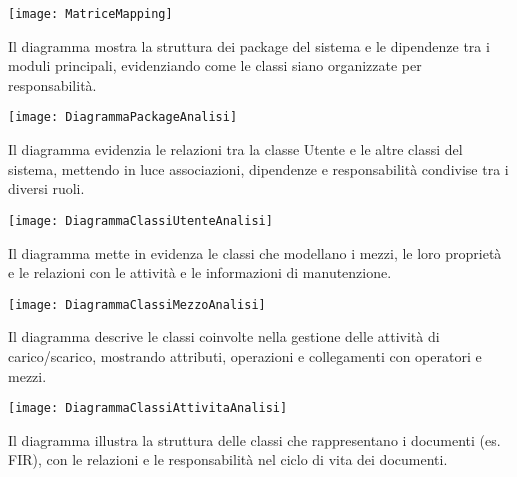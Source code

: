 \documentclass[a4paper]{report}
\begin{document}
\clearpage
{}

\begin{figure*}[!ht]
    \centering
    \texttt{[image: MatriceMapping]}
\end{figure*}



Il diagramma mostra la struttura dei package del sistema e le dipendenze tra i moduli principali, evidenziando come le classi siano organizzate per responsabilità.

\begin{figure*}[!ht]
    \centering
    \texttt{[image: DiagrammaPackageAnalisi]}
\end{figure*}

\clearpage
{}
Il diagramma evidenzia le relazioni tra la classe Utente e le altre classi del sistema, mettendo in luce associazioni, dipendenze e responsabilità condivise tra i diversi ruoli.

\begin{figure*}[!ht]
    \centering
    \texttt{[image: DiagrammaClassiUtenteAnalisi]}
\end{figure*}

\clearpage
{}
Il diagramma mette in evidenza le classi che modellano i mezzi, le loro proprietà e le relazioni con le attività e le informazioni di manutenzione.

\begin{figure*}[!ht]
    \centering
    \texttt{[image: DiagrammaClassiMezzoAnalisi]}
\end{figure*}

\clearpage
{}
Il diagramma descrive le classi coinvolte nella gestione delle attività di carico/scarico, mostrando attributi, operazioni e collegamenti con operatori e mezzi.

\begin{figure*}[!ht]
    \centering
    \texttt{[image: DiagrammaClassiAttivitaAnalisi]}
\end{figure*}

\clearpage
{}
Il diagramma illustra la struttura delle classi che rappresentano i documenti (es. FIR), con le relazioni e le responsabilità nel ciclo di vita dei documenti.
\end{document}
